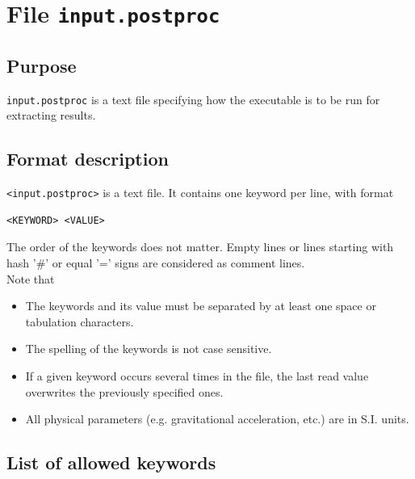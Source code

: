 \section{File \texttt{input.postproc}}
\subsection{Purpose}
\texttt{input.postproc} is a text file specifying how the \swPostProcess executable is to be run for extracting results. 

\subsection{Format description}
\texttt{<input.postproc>} is a text file. It contains one keyword per line, with format
\begin{lstlisting}
<KEYWORD> <VALUE>
\end{lstlisting}
The order of the keywords does not matter. Empty lines or lines starting with hash '\#' or equal '=' signs are considered as comment lines.\\
Note that
\begin{itemize}
\item The keywords and its value must be separated by at least one space or tabulation characters.
\item The spelling of the keywords is not case sensitive.\\
\item If a given keyword occurs several times in the file, the last read value overwrites the previously specified ones.
\item All physical parameters (e.g. gravitational acceleration, etc.) are in S.I. units.
\end{itemize}

\subsection{List of allowed keywords}

